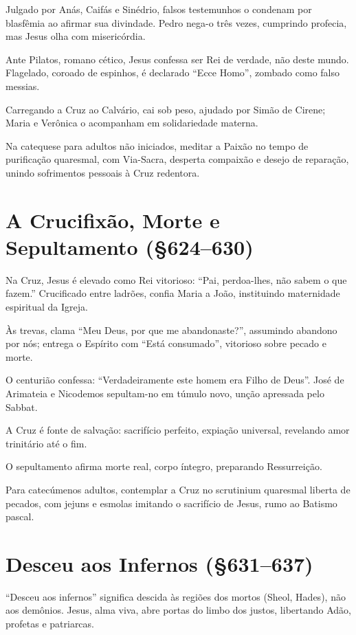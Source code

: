 Julgado por Anás, Caifás e Sinédrio, falsos testemunhos o condenam por blasfêmia ao afirmar sua divindade. Pedro nega-o três vezes, cumprindo profecia, mas Jesus olha com misericórdia.

Ante Pilatos, romano cético, Jesus confessa ser Rei de verdade, não deste mundo. Flagelado, coroado de espinhos, é declarado ``Ecce Homo'', zombado como falso messias.

Carregando a Cruz ao Calvário, cai sob peso, ajudado por Simão de Cirene; Maria e Verônica o acompanham em solidariedade materna.

Na catequese para adultos não iniciados, meditar a Paixão no tempo de purificação quaresmal, com Via-Sacra, desperta compaixão e desejo de reparação, unindo sofrimentos pessoais à Cruz redentora.

\section{A Crucifixão, Morte e Sepultamento (\S 624--630)}

Na Cruz, Jesus é elevado como Rei vitorioso: ``Pai, perdoa-lhes, não sabem o que fazem.'' Crucificado entre ladrões, confia Maria a João, instituindo maternidade espiritual da Igreja.

Às trevas, clama ``Meu Deus, por que me abandonaste?'', assumindo abandono por nós; entrega o Espírito com ``Está consumado'', vitorioso sobre pecado e morte.

O centurião confessa: ``Verdadeiramente este homem era Filho de Deus''. José de Arimateia e Nicodemos sepultam-no em túmulo novo, unção apressada pelo Sabbat.

A Cruz é fonte de salvação: sacrifício perfeito, expiação universal, revelando amor trinitário até o fim.

O sepultamento afirma morte real, corpo íntegro, preparando Ressurreição.

Para catecúmenos adultos, contemplar a Cruz no scrutinium quaresmal liberta de pecados, com jejuns e esmolas imitando o sacrifício de Jesus, rumo ao Batismo pascal.

\section{Desceu aos Infernos (\S 631--637)}

``Desceu aos infernos'' significa descida às regiões dos mortos (Sheol, Hades), não aos demônios. Jesus, alma viva, abre portas do limbo dos justos, libertando Adão, profetas e patriarcas.

